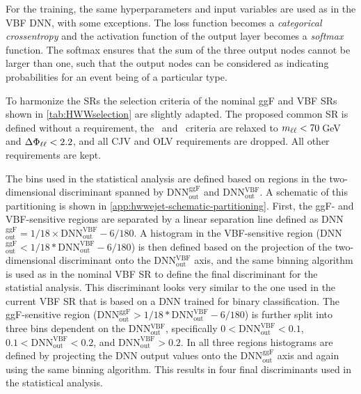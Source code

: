 For the training, the same hyperparameters and input variables are used as in the VBF DNN, with some exceptions. The loss function becomes a \emph{categorical crossentropy} and the activation function of the output layer becomes a \emph{softmax} function.
The softmax ensures that the sum of the three output nodes cannot be larger than one, such that the output nodes can be considered as indicating probabilities for an event being of a particular type. 

To harmonize the \TwoJet SRs the selection criteria of the nominal ggF \TwoJet and VBF \TwoJet SRs shown in \cref{tab:HWWselection} are slightly adapted. 
The proposed common \TwoJet SR is defined without a \pTmiss requirement, the \mll\ and \dphill\ criteria are relaxed to $m_{\ell\ell} < 70\,$GeV and $\Delta\Phi_{\ell\ell} < 2.2$, and all CJV and OLV requirements are dropped. All other requirements are kept. 

The bins used in the statistical analysis are defined based on regions in the two-dimensional discriminant spanned by DNN$_\mathrm{out}^\mathrm{ggF}$ and DNN$_\mathrm{out}^\mathrm{VBF}$. A schematic of this partitioning is shown in \cref{app:hwwejet-schematic-partitioning}.
First, the ggF- and VBF-sensitive regions are separated by a linear separation line defined as DNN$_\mathrm{out}^\mathrm{ggF}= 1/18 \times \text{DNN}_\mathrm{out}^\mathrm{VBF} - 6/180$.
A histogram in the VBF-sensitive region (DNN$_\mathrm{out}^\mathrm{ggF} < 1/18 * \text{DNN}_\mathrm{out}^\mathrm{VBF} - 6/180$) is then defined based on the projection of the two-dimensional discriminant onto the DNN$_\mathrm{out}^\mathrm{VBF}$ axis, and the same binning algorithm is used as in the nominal VBF SR to define the final discriminant for the statistial analysis. This discriminant looks very similar to the one used in the current VBF \TwoJet SR that is based on a DNN trained for binary classification.  
The ggF-sensitive region (DNN$_\mathrm{out}^\mathrm{ggF}> 1/18 * \text{DNN}_\mathrm{out}^\mathrm{VBF} - 6/180$) is further split into three bins dependent on the DNN$_\mathrm{out}^\mathrm{VBF}$, specifically $0 < \text{DNN}_\mathrm{out}^\mathrm{VBF} < 0.1$, $0.1 < \text{DNN}_\mathrm{out}^\mathrm{VBF} < 0.2$, and $\text{DNN}_\mathrm{out}^\mathrm{VBF} > 0.2$. 
In all three regions histograms are defined by projecting the DNN output values onto the DNN$_\mathrm{out}^\mathrm{ggF}$ axis and again using the same binning algorithm.
This results in four final discriminants used in the statistical analysis. 

